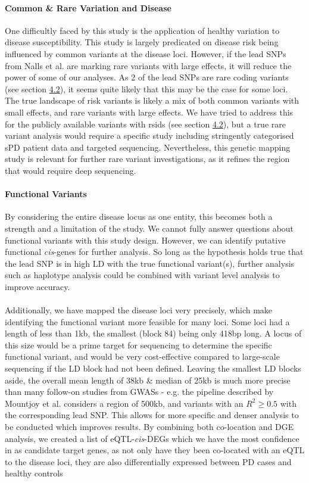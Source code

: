 \documentclass{article}
\begin{document}
\paragraph{Common \& Rare Variation and Disease}
One difficultly faced by this study is the application of healthy variation to disease susceptibility. This study is largely predicated on disease risk being influenced by common variants at the disease loci. However, if the lead SNPs from Nalls et al.\cite{Nalls2019IdentificationStudies} are marking rare variants with large effects, it will reduce the power of some of our analyses. As 2 of the lead SNPs are rare coding variants (see section \hyperref[subsec:codingvariants]{4.2}), it seems quite likely that this may be the case for some loci. The true landscape of risk variants is likely a mix of both common variants with small effects, and rare variants with large effects. We have tried to address this for the publicly available variants with rsids (see section \hyperref[subsec:codingvariants]{4.2}), but a true rare variant analysis would require a specific study including stringently categorised sPD patient data and targeted sequencing. Nevertheless, this genetic mapping study is relevant for further rare variant investigations, as it refines the region that would require deep sequencing.
\paragraph{Functional Variants}By considering the entire disease locus as one entity, this becomes both a strength and a limitation of the study. We cannot fully answer questions about functional variants with this study design. However, we can identify putative functional \textit{cis}-genes for further analysis.  So long as the hypothesis holds true that the lead SNP is in high LD with the true functional variant(s), further analysis such as haplotype analysis could be combined with variant level analysis to improve accuracy\cite{Liang2020HaplotypePhenotypes}. 
\\
\\Additionally, we have mapped the disease loci very precisely, which make identifying the functional variant more feasible for many loci. Some loci had a length of less than 1kb, the smallest (block 84) being only 418bp long. A locus of this size would be a prime target for sequencing to determine the specific functional variant, and would be very cost-effective compared to large-scale sequencing if the LD block had not been defined. Leaving the smallest LD blocks aside, the overall mean length of 38kb \& median of 25kb is much more precise than many follow-on studies from GWASs - e.g. the pipeline described by Mountjoy et al.\cite{Mountjoy2021AnLoci} considers a region of 500kb, and variants with an $R^2\geq0.5$ with the corresponding lead SNP. This allows for more specific and denser analysis to be conducted which improves results\cite{Giambartolomei2014BayesianStatistics}. By combining both co-location and DGE analysis, we created a list of eQTL-\textit{cis}-DEGs which we have the most confidence in as candidate target genes, as not only have they been co-located with an eQTL to the disease loci, they are also differentially expressed between PD cases and healthy controls
\end{document}
